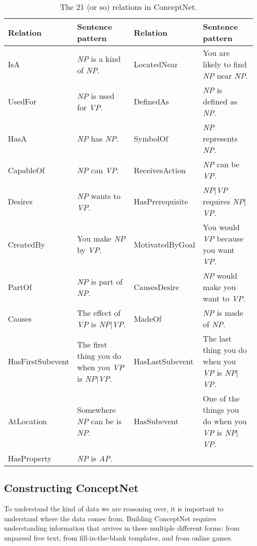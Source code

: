 \documentclass[11pt]{article}
\begin{document}
\begin{table}[tp]
\begin{small}
\begin{tabular}{lp{1.5in}|lp{2.3in}}
{\bf Relation} & {\bf Sentence pattern} & {\bf Relation} & {\bf Sentence
pattern}\\
\hline
IsA & {\em NP} is a kind of {\em NP}.&              LocatedNear & You are likely to find {\em NP} near {\em NP}.\\               
UsedFor & {\em NP} is used for {\em VP}.&           DefinedAs & {\em NP} is defined as {\em NP}.\\
HasA & {\em NP} has {\em NP}.&                      SymbolOf & {\em NP} represents {\em NP}.\\
CapableOf & {\em NP} can {\em VP}.&                 ReceivesAction & {\em NP} can be {\em VP}.\\
Desires & {\em NP} wants to {\em VP}.&              HasPrerequisite & {\em NP$|$VP} requires {\em NP$|$VP}.\\
CreatedBy & You make {\em NP} by {\em VP}.&         MotivatedByGoal & You would {\em VP} because you want {\em VP}.\\
PartOf & {\em NP} is part of {\em NP}.&             CausesDesire & {\em NP} would make you want to {\em VP}.\\
Causes & The effect of {\em VP} is {\em NP$|$VP}.&  MadeOf & {\em NP} is made of {\em NP}.\\             
HasFirstSubevent & The first thing you do when you {\em VP} is {\em NP$|$VP}.& HasLastSubevent & The last thing you do when you {\em VP} is {\em NP$|$VP}.\\
AtLocation & Somewhere {\em NP} can be is {\em NP}.& HasSubevent & One of the things you do when you {\em VP} is {\em NP$|$VP}.\\
HasProperty & {\em NP} is {\em AP}.&                
\end{tabular}
\end{small}
\caption{The 21 (or so) relations in ConceptNet.}
\label{table:relations}
\end{table}

\subsection{Constructing ConceptNet}

To understand the kind of data we are reasoning over, it is important to
understand where the data comes from. Building ConceptNet requires
understanding information that arrives in these multiple different forms: from
unparsed free text, from fill-in-the-blank templates, and from online games.
\end{document}
